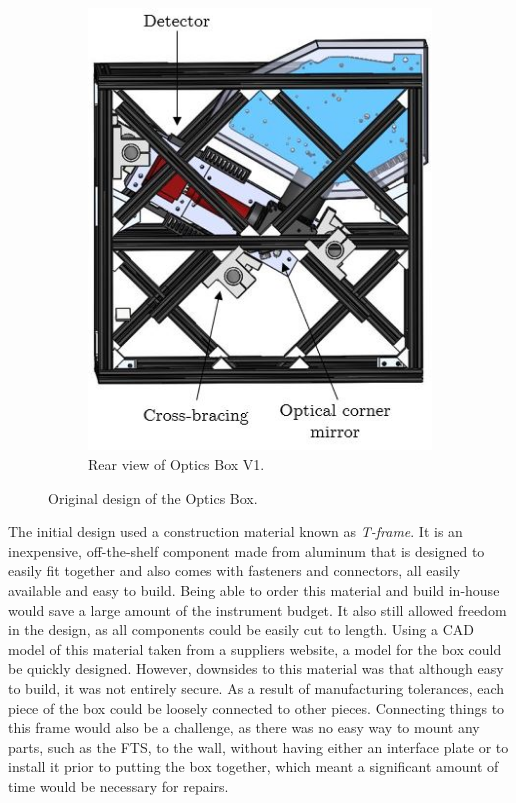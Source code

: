 \begin{figure}
\begin{subfigure}[h]{0.42\textwidth}
        \includegraphics[width=\textwidth]{chap3_images/LIFE_V1_images/Optics_Box_V1_V0_rear_view_labelled.JPG}
        \caption{Rear view of Optics Box V1.}
        \label{fig:OB_V1_rear}
    \end{subfigure}
    \caption{Original design of the Optics Box.}
    \label{fig:OB_V1}
\end{figure}

The initial design used a construction material known as \textit{T-frame}. It is an inexpensive, off-the-shelf component made from aluminum that is designed to easily fit together and also comes with fasteners and connectors, all easily available and easy to build. Being able to order this material and build in-house would save a large amount of the instrument budget. It also still allowed freedom in the design, as all components could be easily cut to length. Using a CAD model of this material taken from a suppliers website, a model for the box could be quickly designed. However, downsides to this material was that although easy to build, it was not entirely secure. As a result of manufacturing tolerances, each piece of the box could be loosely connected to other pieces. Connecting things to this frame would also be a challenge, as there was no easy way to mount any parts, such as the FTS, to the wall, without having either an interface plate or to install it prior to putting the box together, which meant a significant amount of time would be necessary for repairs.

